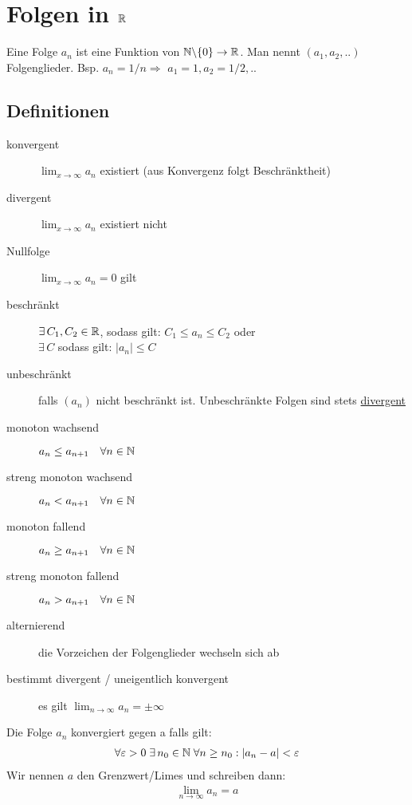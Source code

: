 \section{Folgen in $\mathbb{R}$}
Eine Folge $a_n$ ist eine Funktion von $\mathbb{N} \backslash \{0\} \to \mathbb{R}$. Man nennt $(a_1, a_2, .. )$ Folgenglieder. Bsp. $a_n = 1/n \Rightarrow$  $a_1 = 1, a_2 = 1/2, ..$  

\subsection{Definitionen}
\begin{description}
  \item[konvergent] $\lim_{x \to \infty} a_n$ existiert  (aus Konvergenz folgt Beschränktheit)
  \item[divergent] $\lim_{x \to \infty} a_n$ existiert nicht 
  \item[Nullfolge] $\lim_{x \to \infty} a_n = 0$ gilt 
  \item[beschränkt] $\exists \, C_1, C_2 \in \mathbb{R}$, sodass gilt: $C_1 \leq a_n \leq C_2$ \hspace{0.3cm} oder\\
  $\exists \, C$ sodass gilt: $|a_n| \leq C$
  \item[unbeschränkt] falls $(a_n)$ nicht beschränkt ist. Unbeschränkte Folgen
  sind stets \underline{divergent}
  \item[monoton wachsend] $a_n \leq a_{n+1} \quad \forall n \in \mathbb{N}$ 
  \item[streng monoton wachsend] $a_n < a_{n+1} \quad \forall n \in \mathbb{N}$
  \item[monoton fallend] $a_n \geq a_{n+1} \quad \forall n \in \mathbb{N}$
  \item[streng monoton fallend] $a_n > a_{n+1} \quad \forall n \in \mathbb{N}$
  \item[alternierend] {\small die Vorzeichen der Folgenglieder wechseln sich ab}
  \item[bestimmt divergent / uneigentlich konvergent] es gilt $\lim_{n \to
  \infty} a_n = \pm \infty$
\end{description}

\begin{definition} 
Die Folge $a_n$ konvergiert gegen a falls gilt:\\
\vspace{-0.3cm}\begin{align*}
\forall \varepsilon > 0 \; \exists \, n_0 \in \mathbb{N} \; \forall n \geq n_0: |a_n - a| < \varepsilon
\end{align*}
Wir nennen $a$ den Grenzwert/Limes und schreiben dann:
\begin{align*}
	\lim_{n \to \infty} a_n = a
\end{align*}
\end{definition}

